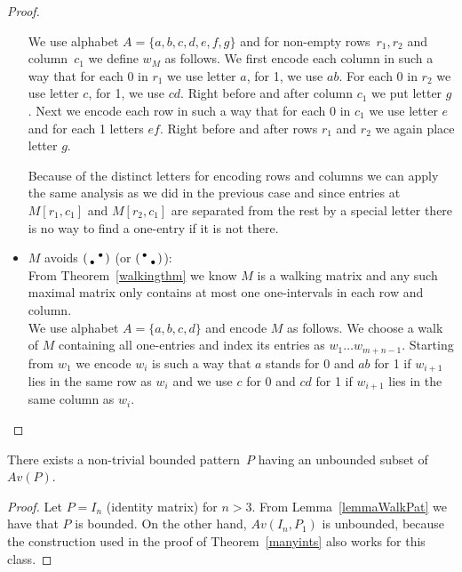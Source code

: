 \begin{proof}
\begin{itemize}
		We use alphabet $A=\{a,b,c,d,e,f,g\}$ and for non-empty rows~$r_1,r_2$ and column~$c_1$ we define $w_M$ as follows. We first encode each column in such a way that for each 0 in $r_1$ we use letter $a$, for 1, we use $ab$. For each 0 in $r_2$ we use letter $c$, for 1, we use $cd$. Right before and after column $c_1$ we put letter $g$. Next we encode each row in such a way that for each 0 in $c_1$ we use letter $e$ and for each 1 letters $ef$. Right before and after rows $r_1$ and $r_2$ we again place letter $g$.
		
		Because of the distinct letters for encoding rows and columns we can apply the same analysis as we did in the previous case and since entries at $M[r_1,c_1]$ and $M[r_2,c_1]$ are separated from the rest by a special letter there is no way to find a one-entry if it is not there.
	\item $M$ avoids $\left(\begin{smallmatrix} &\bullet\\\bullet& \end{smallmatrix}\right)$ (or $\left(\begin{smallmatrix}\bullet& \\ &\bullet\end{smallmatrix}\right)$):\\
		From Theorem~\ref{walkingthm} we know $M$ is a walking matrix and any such maximal matrix only contains at most one one-intervals in each row and column.\\
		
		We use alphabet $A=\{a,b,c,d\}$ and encode $M$ as follows. We choose a walk of $M$ containing all one-entries and index its entries as $w_1\dots w_{m+n-1}$. Starting from $w_1$ we encode $w_i$ is such a way that $a$ stands for 0 and $ab$ for 1 if $w_{i+1}$ lies in the same row as $w_i$ and we use $c$ for 0 and $cd$ for 1 if $w_{i+1}$ lies in the same column as $w_i$.
\end{itemize}
\end{proof}

\begin{obs}
There exists a non-trivial bounded pattern~$P$ having an unbounded subset of $Av(P)$.
\end{obs}
\begin{proof}
Let $P=I_n$ (identity matrix) for $n>3$. From Lemma~\ref{lemmaWalkPat} we have that $P$ is bounded. On the other hand, $Av(I_n,P_1)$ is unbounded, because the construction used in the proof of Theorem~\ref{manyints} also works for this class.
\end{proof}

